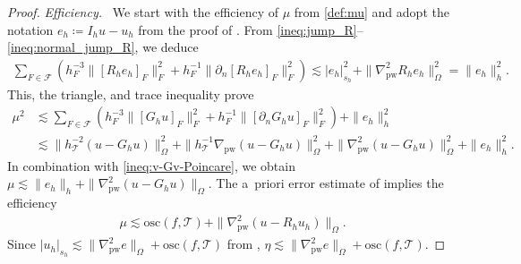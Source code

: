 \documentclass[a4paper]{amsart}
\numberwithin{equation}{section}
\def\F{\mathcal{F}}
\def\T{\mathcal{T}}
\def\pw{\mathrm{pw}}
\theoremstyle{definition}
\theoremstyle{remark}
\numberwithin{theorem}{section}
\numberwithin{equation}{section}
\numberwithin{table}{section}
\numberwithin{figure}{section}
\begin{document}
\begin{proof}
\noindent\emph{Efficiency.~} We start with the efficiency of $\mu$ from \eqref{def:mu} and adopt the notation $e_h \coloneqq I_h u - u_h$ from the proof of . From \eqref{ineq:jump_R}--\eqref{ineq:normal_jump_R}, we deduce
\begin{align*}
	\sum_{F \in \F} (h_F^{-3}\|[R_h e_h]_F\|_F^2 + h_F^{-1}\|\partial_n[R_h e_h]_F\|_F^2)
	\lesssim |e_h|_{s_h}^2 + \|\nabla_\pw^2 R_h e_h\|^2_\Omega = \|e_h\|_h^2.
\end{align*}
This, the triangle, and trace inequality prove
\begin{align*}
	\mu^2 &\lesssim \sum_{F \in \F} (h_F^{-3}\|[G_h u]_F\|_F^2 + h_F^{-1}\|[\partial_n G_h u]_F\|_F^2) + \|e_h\|_h^2\nonumber\\
	&\lesssim \|h_\T^{-2}(u - G_h u)\|_\Omega^2 + \|h_\T^{-1}\nabla_\pw(u - G_h u)\|_\Omega^2 + \|\nabla_\pw^2(u - G_h u)\|^2_\Omega + \|e_h\|_h^2.
\end{align*}
In combination with \eqref{ineq:v-Gv-Poincare}, we obtain $\mu \lesssim \|e_h\|_h + \|\nabla_\pw^2(u - G_h u)\|_\Omega$.
The a~priori error estimate of  implies the efficiency 
\begin{align}\label{ineq:proof-efficiency-mu}
	\mu \lesssim \mathrm{osc}(f, \T) + \|\nabla_\pw^2(u - R_h u_h)\|_\Omega.
\end{align}
Since $|u_h|_{s_h} \lesssim \|\nabla_\pw^2 e\|_\Omega + \mathrm{osc}(f,\T)$ from , $\eta \lesssim \|\nabla_\pw^2 e\|_\Omega + \mathrm{osc}(f,\T)$.



\end{proof}
\end{document}
